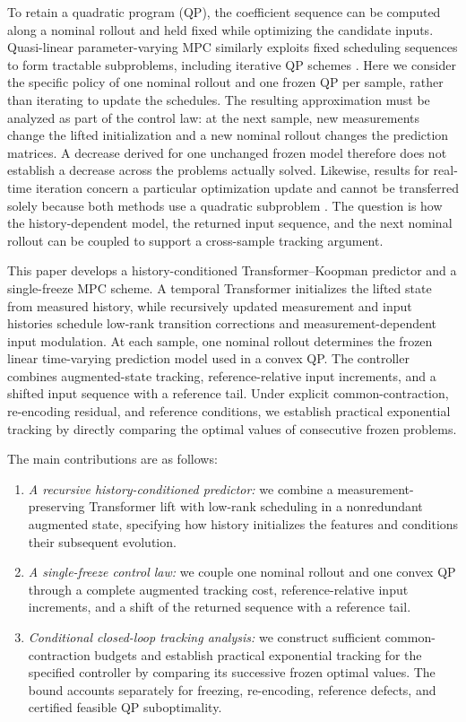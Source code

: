 \documentclass[journal]{IEEEtran}
\theoremstyle{plain}
\theoremstyle{definition}
\begin{document}
To retain a quadratic program (QP), the coefficient sequence can be computed along a nominal rollout and held fixed while optimizing the candidate inputs. Quasi-linear parameter-varying MPC similarly exploits fixed scheduling sequences to form tractable subproblems, including iterative QP schemes \cite{cisneros2016qlmpc,cisneros2020qlpv}. Here we consider the specific policy of one nominal rollout and one frozen QP per sample, rather than iterating to update the schedules. The resulting approximation must be analyzed as part of the control law: at the next sample, new measurements change the lifted initialization and a new nominal rollout changes the prediction matrices. A decrease derived for one unchanged frozen model therefore does not establish a decrease across the problems actually solved. Likewise, results for real-time iteration concern a particular optimization update and cannot be transferred solely because both methods use a quadratic subproblem \cite{diehl2005realtime,gros2020rti}. The question is how the history-dependent model, the returned input sequence, and the next nominal rollout can be coupled to support a cross-sample tracking argument.

This paper develops a history-conditioned Transformer--Koopman predictor and a single-freeze MPC scheme. A temporal Transformer initializes the lifted state from measured history, while recursively updated measurement and input histories schedule low-rank transition corrections and measurement-dependent input modulation. At each sample, one nominal rollout determines the frozen linear time-varying prediction model used in a convex QP. The controller combines augmented-state tracking, reference-relative input increments, and a shifted input sequence with a reference tail. Under explicit common-contraction, re-encoding residual, and reference conditions, we establish practical exponential tracking by directly comparing the optimal values of consecutive frozen problems.

The main contributions are as follows:
\begin{enumerate}
\item \emph{A recursive history-conditioned predictor:} we combine a measurement-preserving Transformer lift with low-rank scheduling in a nonredundant augmented state, specifying how history initializes the features and conditions their subsequent evolution.
\item \emph{A single-freeze control law:} we couple one nominal rollout and one convex QP through a complete augmented tracking cost, reference-relative input increments, and a shift of the returned sequence with a reference tail.
\item \emph{Conditional closed-loop tracking analysis:} we construct sufficient common-contraction budgets and establish practical exponential tracking for the specified controller by comparing its successive frozen optimal values. The bound accounts separately for freezing, re-encoding, reference defects, and certified feasible QP suboptimality.
\end{enumerate}
\end{document}
